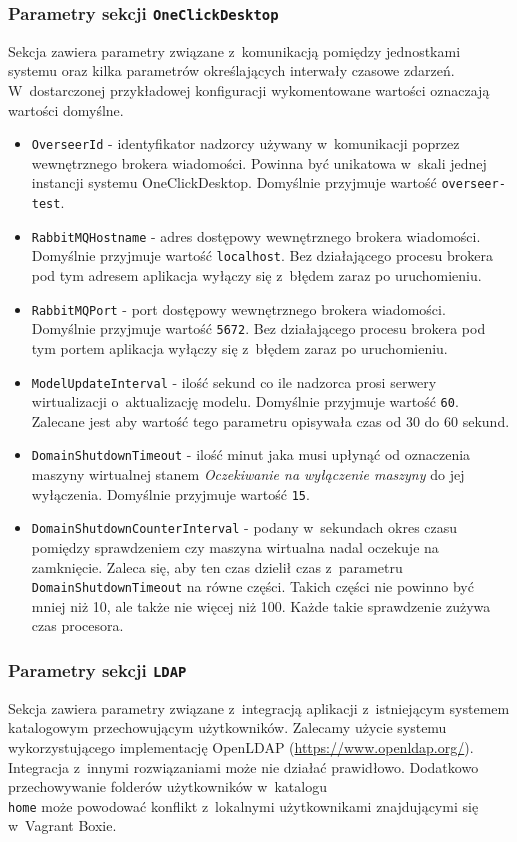 \documentclass[../opis-rozwiazania.tex]{subfiles}
\begin{document}
\subsubsection{Parametry sekcji \texttt{OneClickDesktop}}
Sekcja zawiera parametry związane z~komunikacją pomiędzy jednostkami systemu oraz kilka parametrów określających interwały czasowe zdarzeń.
W~dostarczonej przykładowej konfiguracji wykomentowane wartości oznaczają wartości domyślne.
\begin{itemize}
  \item \texttt{OverseerId} - identyfikator nadzorcy używany w~komunikacji poprzez wewnętrznego brokera wiadomości. Powinna być unikatowa w~skali jednej instancji systemu OneClickDesktop. Domyślnie przyjmuje wartość \texttt{overseer-test}.
  \item \texttt{RabbitMQHostname} - adres dostępowy wewnętrznego brokera wiadomości. Domyślnie przyjmuje wartość \texttt{localhost}. Bez działającego procesu brokera pod tym adresem aplikacja wyłączy się z~błędem zaraz po uruchomieniu.
  \item \texttt{RabbitMQPort} - port dostępowy wewnętrznego brokera wiadomości. Domyślnie przyjmuje wartość \texttt{5672}. Bez działającego procesu brokera pod tym portem aplikacja wyłączy się z~błędem zaraz po uruchomieniu.
  \item \texttt{ModelUpdateInterval} - ilość sekund co ile nadzorca prosi serwery wirtualizacji o~aktualizację modelu. Domyślnie przyjmuje wartość \texttt{60}. Zalecane jest aby wartość tego parametru opisywała czas od 30 do 60 sekund.																												%
  \item \texttt{DomainShutdownTimeout} - ilość minut jaka musi upłynąć od oznaczenia maszyny wirtualnej stanem \textit{Oczekiwanie na wyłączenie maszyny} do jej wyłączenia. Domyślnie przyjmuje wartość \texttt{15}.
  \item \texttt{DomainShutdownCounterInterval} - podany w~sekundach okres czasu pomiędzy sprawdzeniem czy maszyna wirtualna nadal oczekuje na zamknięcie. Zaleca się, aby ten czas dzielił czas z~parametru \texttt{DomainShutdownTimeout} na równe części. Takich części nie powinno być mniej niż 10, ale także nie więcej niż 100. Każde takie sprawdzenie zużywa czas procesora.
\end{itemize}

\subsubsection{Parametry sekcji \texttt{LDAP}}
Sekcja zawiera parametry związane z~integracją aplikacji z~istniejącym systemem katalogowym przechowującym użytkowników. Zalecamy użycie systemu wykorzystującego implementację OpenLDAP (\url{https://www.openldap.org/}). Integracja z~innymi rozwiązaniami może nie działać prawidłowo. Dodatkowo przechowywanie folderów użytkowników w~katalogu \texttt{\\home} może powodować konflikt z~lokalnymi użytkownikami znajdującymi się w~Vagrant Boxie.
\end{document}
